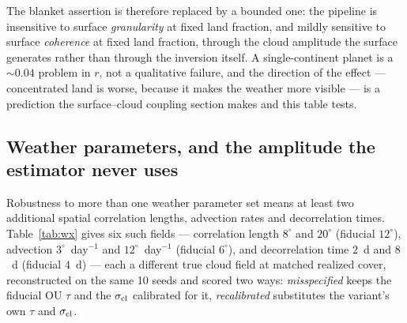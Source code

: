 \documentclass[twocolumn,10pt]{article}
\begin{document}
The blanket assertion is therefore replaced by a bounded one: the
pipeline is insensitive to surface \emph{granularity} at fixed land fraction,
and mildly sensitive to surface \emph{coherence} at fixed land fraction, through
the cloud amplitude the surface generates rather than through the inversion
itself. A single-continent planet is a $\sim0.04$ problem in $r$, not a
qualitative failure, and the direction of the effect --- concentrated land is
worse, because it makes the weather more visible --- is a prediction the
surface--cloud coupling section makes and this table tests.

\subsection{Weather parameters, and the amplitude the estimator never uses}
\label{sec:wxsens}
Robustness to more than one weather parameter set means at least two
additional spatial correlation lengths, advection rates and decorrelation
times. Table~\ref{tab:wx}
gives six such fields --- correlation length $8^\circ$ and $20^\circ$ (fiducial
$12^\circ$), advection $3^\circ$~day$^{-1}$ and $12^\circ$~day$^{-1}$ (fiducial
$6^\circ$), and decorrelation time $2$~d and $8$~d (fiducial $4$~d) --- each a
different true cloud field at matched realized cover, reconstructed on the same
10 seeds and scored two ways: \emph{misspecified} keeps the fiducial OU $\tau$
and the $\sigma_{\rm cl}$ calibrated for it, \emph{recalibrated} substitutes the
variant's own $\tau$ and $\sigma_{\rm cl}$.
\end{document}
